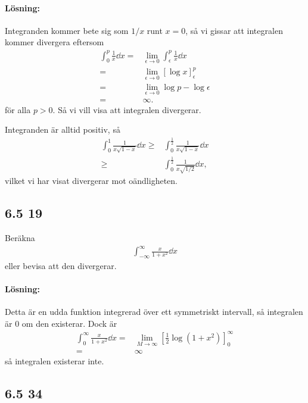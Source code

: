 \paragraph{Lösning:}

Integranden kommer bete sig som $1 / x$ runt $x = 0$, så vi gissar att integralen kommer divergera eftersom
\begin{align*}
	\int_0^p \frac{1}{x} \dd{x} ={}& \lim_{\epsilon \to 0} \int_\epsilon^p \frac{1}{x} \dd{x}\\
	={}& \lim_{\epsilon \to 0} [\log{x}]_\epsilon^p\\
	={}& \lim_{\epsilon \to 0} \log{p} - \log{\epsilon}\\
	={}& \infty.
\end{align*}
för alla $p > 0$.
Så vi vill visa att integralen divergerar.

Integranden är alltid positiv, så
\begin{align*}
	\int_0^1 \frac{1}{x \sqrt{1 - x}} \dd{x} \geq{}& \int_0^\frac{1}{2} \frac{1}{x \sqrt{1 - x}} \dd{x}\\
	\geq{}& \int_0^\frac{1}{2} \frac{1}{x \sqrt{1 / 2}} \dd{x},
\end{align*}
vilket vi har visat divergerar mot oändligheten.


\subsection{6.5 19}%
\label{sub:6_5_19}

Beräkna
\begin{align*}
	\int_{-\infty}^\infty \frac{x}{1 + x^2} \dd{x}
\end{align*}
eller bevisa att den divergerar.

\paragraph{Lösning:}

Detta är en udda funktion integrerad över ett symmetriskt intervall, så integralen är $0$ om den existerar.
Dock är
\begin{align*}
	\int_{0}^\infty \frac{x}{1 + x^2} \dd{x} ={}& \lim_{M \to \infty} [\frac{1}{2} \log{(1 + x^2)}]_0^\infty\\
	={}& \infty
\end{align*}
så integralen existerar inte.


\subsection{6.5 34}%
\label{sub:6_5_34}

